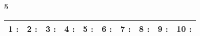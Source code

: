 \documentclass[a4paper, 11pt]{article}
\begin{document}
{\Large\bf 5 } \hspace{1.5cm}
\begin{tabular}{| l|l|l|l|l|l|l|l|l|l| }
\hline
{\large 1 }: \hspace*{0.5cm}
& {\large 2 }: \hspace*{0.5cm}
& {\large 3 }: \hspace*{0.5cm}
& {\large 4 }: \hspace*{0.5cm}
& {\large 5 }: \hspace*{0.5cm}
& {\large 6 }: \hspace*{0.5cm}
& {\large 7 }: \hspace*{0.5cm}
& {\large 8 }: \hspace*{0.5cm}
& {\large 9 }: \hspace*{0.5cm}
& {\large 10 }: \hspace*{0.5cm}
\\ 
 \hline
\end{tabular}
\vspace*{1cm} 
\end{document}
